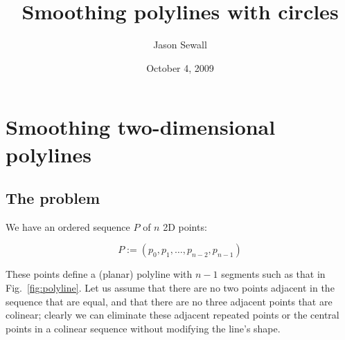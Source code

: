 \documentclass{article}
\title{Smoothing polylines with circles}
\author{Jason Sewall}
\date{October 4, 2009}
\begin{document}
\maketitle

\section{Smoothing two-dimensional polylines}

\subsection{The problem}
We have an ordered sequence $P$ of $n$ 2D points:

\begin{equation}
  \label{eq:points}
  P := \left(p_{0}, p_{1},\ldots,p_{n-2},p_{n-1}\right)
\end{equation}

These points define a (planar) polyline with $n-1$ segments such as that in Fig.~\ref{fig:polyline}.  Let us assume that there are no two points adjacent in the sequence that are equal, and that there are no three adjacent points that are colinear; clearly we can eliminate these adjacent repeated points or the central points in a colinear sequence without modifying the line's shape.
\end{document}
